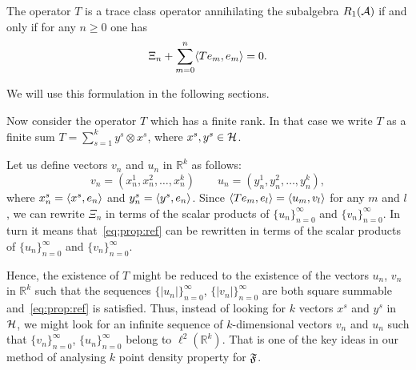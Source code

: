 \documentclass[12pt]{amsart}
\theoremstyle{case}
\begin{document}
  \begin{prop}
    \label{prop:reformulation}
    The operator $T$ is a trace class operator annihilating the subalgebra $R_1(\cal{A})$ if and only if
      for any $n \geq 0$ one has 
        \begin{equation}
          \label{eq:prop:ref}
          \Xi_n + \sum_{m=0}^n \inner{Te_m}{e_m} = 0.
        \end{equation}
  \end{prop}
    We will use this formulation in the following sections.

  \medskip
  Now consider the operator $T$ which has a finite rank.
  In that case we write $T$ as a finite sum $T = \sum_{s=1}^k y^s \otimes x^s$,
    where $x^s, y^s \in \cal{H}$.

  Let us define vectors $v_n$ and $u_n$ in $\mathbb{R}^k$ as follows:
  \begin{equation*}
    v_n = (x^1_n, x^2_n, \dots, x^k_n)\qquad
    u_n = (y^1_n, y^2_n, \dots, y^k_n),
  \end{equation*}
  where $x^s_n = \inner{x^s}{e_n}$ and $y^s_n = \inner{y^s}{e_n}$.
  Since $\inner{Te_m}{e_l} = \inner{u_m}{v_l}$ for any $m$ and $l$, we can rewrite $\Xi_n$ in terms of
    the scalar products of $\{u_n\}_{n=0}^\infty$ and $\{v_n\}_{n=0}^\infty$.
  In turn it means that~\eqref{eq:prop:ref} can be rewritten in terms of the scalar products
    of $\{u_n\}_{n=0}^\infty$ and $\{v_n\}_{n=0}^\infty$.

  Hence, the existence of $T$ might be reduced to the existence of
    the vectors $u_n$, $v_n$ in $\mathbb{R}^k$ such that the sequences $\{\lvert u_n\rvert\}_{n=0}^\infty$,
    $\{\lvert v_n\rvert\}_{n=0}^\infty$ are both square summable and~\eqref{eq:prop:ref} is satisfied.
  Thus, instead of looking for $k$ vectors $x^s$ and $y^s$ in $\cal{H}$, we might look for an infinite sequence
    of $k$-dimensional vectors $v_n$ and $u_n$ such that $\{v_n \}_{n=0}^\infty$, $\{u_n\}_{n=0}^\infty$ belong to $\ell^2(\mathbb{R}^k)$.
  That is one of the key ideas in our method of analysing $k$ point density property for $\fsys$.
\end{document}
